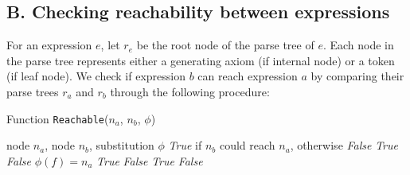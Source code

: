 \documentclass{article}
\begin{document}
\subsection*{B. Checking reachability between expressions}
\label{app:reach}
For an expression $e$, 
let $r_e$ be the root node of the parse tree of $e$. Each node in the parse tree represents either a generating axiom (if internal node) or a token (if leaf node). 
We check if expression $b$ can reach expression $a$ by comparing their parse trees $r_a$
and $r_b$ through the following procedure:
\begin{algorithm}[t]
   \caption{Function \texttt{Reachable}($n_a$, $n_b$, $\phi$)}
   \label{algo:reach}
   \begin{algorithmic}
     node $n_a$, node $n_b$, substitution $\phi$ 
     \emph{True} if $n_b$ could reach $n_a$, otherwise \emph{False}
                 \emph{True} 
            \ELSE 
                 \emph{False} 
            \ENDIF
        \ELSE
            \STATE $\phi(f)=n_a$ 
             \emph{True}
        \ENDIF
    \ELSE
                \STATE{}
                    \STATE{}
                     \emph{False} 
                \ENDIF
            \ENDFOR
            \STATE{}
             \emph{True} 
        \ELSE
             \emph{False} 
        \ENDIF
    \ENDIF
   \end{algorithmic}
   
\end{algorithm}
\end{document}
